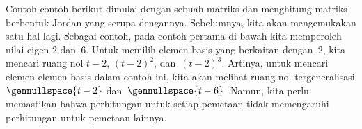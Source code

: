 
Contoh-contoh berikut dimulai dengan sebuah matriks dan menghitung
matriks berbentuk Jordan yang serupa dengannya.
Sebelumnya, kita akan mengemukakan satu hal lagi.
Sebagai contoh, pada contoh pertama di bawah kita memperoleh nilai eigen $2$
dan~$6$.
Untuk memilih elemen basis yang berkaitan dengan~\( 2\), kita mencari ruang nol
$t-2$, \( (t-2)^2 \), dan~\( (t-2)^3\).
Artinya, untuk mencari elemen-elemen basis dalam contoh ini, kita akan
melihat ruang nol tergeneralisasi $\gennullspace{t-2}$
dan~$\gennullspace{t-6}$.
Namun, kita perlu memastikan bahwa perhitungan untuk setiap pemetaan tidak
memengaruhi perhitungan untuk pemetaan lainnya.



